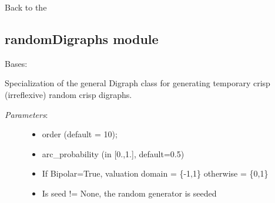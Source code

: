 \documentclass[letterpaper,10pt,english]{sphinxmanual}
\begin{document}
Back to the {\hyperref[techDoc:technical-label]{\emph{}}}


\subsection{randomDigraphs module}
\label{techDoc:randomdigraphs-label}\label{techDoc:module-randomDigraphs}\label{techDoc:randomdigraphs-module}

\begin{fulllineitems}
\label{techDoc:randomDigraphs.RandomDigraph}
Bases: {\hyperref[techDoc:digraphs.Digraph]{\emph{}}}

Specialization of the general Digraph class for generating
temporary crisp (irreflexive) random crisp digraphs.
\begin{description}
\item[{\emph{Parameters}:}] \leavevmode\begin{itemize}
\item {} 
order (default = 10);

\item {} 
arc\_probability (in {[}0.,1.{]}, default=0.5)

\item {} 
If Bipolar=True, valuation domain = \{-1,1\} otherwise = \{0,1\}

\item {} 
Is seed != None, the random generator is seeded

\end{itemize}

\end{description}

\end{fulllineitems}

\end{document}
